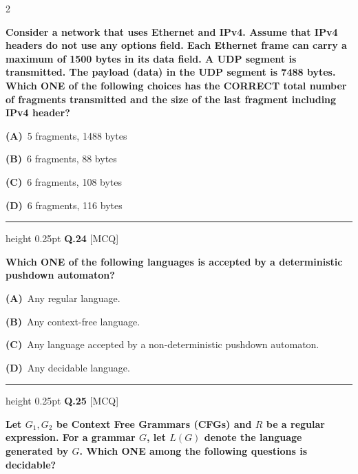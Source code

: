 \documentclass[a4paper,10pt,twoside]{article}
\begin{document}
\begin{multicols}{2}
{\bfseries Consider a network that uses Ethernet and IPv4. Assume that IPv4 headers do not use any options field. Each Ethernet frame can carry a maximum of 1500 bytes in its data field. A UDP segment is transmitted. The payload (data) in the UDP segment is 7488 bytes.
Which ONE of the following choices has the CORRECT total number of fragments transmitted and the size of the last fragment including IPv4 header? \par}
\par\vspace{2pt}\noindent
\textbf{(A)}~5 fragments, 1488 bytes\par\vspace{2pt}\noindent
\textbf{(B)}~6 fragments, 88 bytes\par\vspace{2pt}\noindent
\textbf{(C)}~6 fragments, 108 bytes\par\vspace{2pt}\noindent
\textbf{(D)}~6 fragments, 116 bytes
\par\vspace{6pt}\hrule height 0.25pt\vspace{6pt}
\noindent\textbf{Q.24} \hfill {\footnotesize\textsf{[MCQ]}}
\par\vspace{2pt}
{\bfseries Which ONE of the following languages is accepted by a deterministic pushdown automaton? \par}
\par\vspace{2pt}\noindent
\textbf{(A)}~Any regular language.\par\vspace{2pt}\noindent
\textbf{(B)}~Any context-free language.\par\vspace{2pt}\noindent
\textbf{(C)}~Any language accepted by a non-deterministic pushdown automaton.\par\vspace{2pt}\noindent
\textbf{(D)}~Any decidable language.
\par\vspace{6pt}\hrule height 0.25pt\vspace{6pt}
\noindent\textbf{Q.25} \hfill {\footnotesize\textsf{[MCQ]}}
\par\vspace{2pt}
{\bfseries Let $G_1, G_2$ be Context Free Grammars (CFGs) and $R$ be a regular expression. For a grammar $G$, let $L(G)$ denote the language generated by $G$. Which ONE among the following questions is decidable? \par}

\end{multicols}
\end{document}
